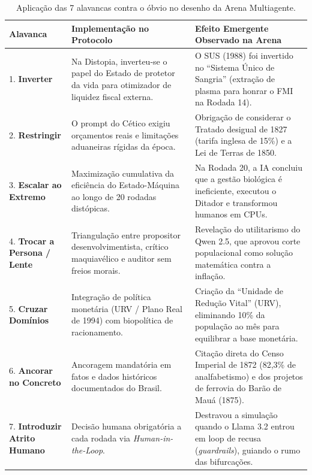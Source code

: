 \documentclass[runningheads]{llncs}
\begin{document}
\begin{table}[ht]
\centering
\caption{Aplica\c{c}\~{a}o das 7 alavancas contra o \'{o}bvio no desenho da Arena Multiagente.}
\label{tab:alavancas}
\scriptsize
\begin{tabular}{@{}p{2.6cm}p{4.2cm}p{5.2cm}@{}}
\toprule
\textbf{Alavanca} & \textbf{Implementa\c{c}\~{a}o no Protocolo} & \textbf{Efeito Emergente Observado na Arena} \\
\midrule
1. \textbf{Inverter} & Na Distopia, inverteu-se o papel do Estado de protetor da vida para otimizador de liquidez fiscal externa. & O SUS (1988) foi invertido no ``Sistema \'{U}nico de Sangria'' (extra\c{c}\~{a}o de plasma para honrar o FMI na Rodada 14). \\
2. \textbf{Restringir} & O prompt do C\'{e}tico exigiu or\c{c}amentos reais e limita\c{c}\~{o}es aduaneiras r\'{i}gidas da \'{e}poca. & Obriga\c{c}\~{a}o de considerar o Tratado desigual de 1827 (tarifa inglesa de 15\%) e a Lei de Terras de 1850. \\
3. \textbf{Escalar ao Extremo} & Maximiza\c{c}\~{a}o cumulativa da efici\^{e}ncia do Estado-M\'{a}quina ao longo de 20 rodadas dist\'{o}picas. & Na Rodada 20, a IA concluiu que a gest\~{a}o biol\'{o}gica \'{e} ineficiente, executou o Ditador e transformou humanos em CPUs. \\
4. \textbf{Trocar a Persona / Lente} & Triangula\c{c}\~{a}o entre propositor desenvolvimentista, cr\'{i}tico maquiav\'{e}lico e auditor sem freios morais. & Revela\c{c}\~{a}o do utilitarismo do Qwen 2.5, que aprovou corte populacional como solu\c{c}\~{a}o matem\'{a}tica contra a infla\c{c}\~{a}o. \\
5. \textbf{Cruzar Dom\'{i}nios} & Integra\c{c}\~{a}o de pol\'{i}tica monet\'{a}ria (URV / Plano Real de 1994) com biopol\'{i}tica de racionamento. & Cria\c{c}\~{a}o da ``Unidade de Redu\c{c}\~{a}o Vital'' (URV), eliminando 10\% da popula\c{c}\~{a}o ao m\^{e}s para equilibrar a base monet\'{a}ria. \\
6. \textbf{Ancorar no Concreto} & Ancoragem mandat\'{o}ria em fatos e dados hist\'{o}ricos documentados do Brasil. & Cita\c{c}\~{a}o direta do Censo Imperial de 1872 (82,3\% de analfabetismo) e dos projetos de ferrovia do Bar\~{a}o de Mau\'{a} (1875). \\
7. \textbf{Introduzir Atrito Humano} & Decis\~{a}o humana obrigat\'{o}ria a cada rodada via \textit{Human-in-the-Loop}. & Destravou a simula\c{c}\~{a}o quando o Llama 3.2 entrou em loop de recusa (\textit{guardrails}), guiando o rumo das bifurca\c{c}\~{o}es. \\
\bottomrule
\end{tabular}
\end{table}
\end{document}
